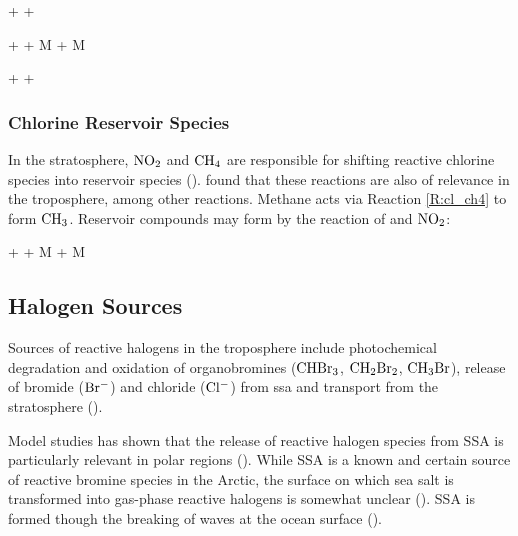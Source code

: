 \begin{reaction}
     +  \rightarrow {} + 
    \label{R:14}
\end{reaction}


\begin{reaction}
     +  + M \rightarrow {} + M
    \label{R:9}
\end{reaction}


\begin{reaction}
     +    + 
    \label{R:13}
\end{reaction}




\subsubsection{Chlorine Reservoir Species}

In the stratosphere, $\mathrm{NO_2}$ and $\mathrm{CH_4}$ are responsible for shifting reactive chlorine species into reservoir species (\cite{SeinfeldSpyros}). \cite{Wang_2019} found that these reactions are also of relevance in the troposphere, among other reactions. Methane acts via Reaction \ref{R:cl_ch4} to form $\mathrm{CH_3}$. Reservoir compounds may form by the reaction of  and $\mathrm{NO_2}$: 

\begin{reaction}
     +  + M \rightarrow {} + M
    \label{R:clono2}
\end{reaction}

\subsection{Halogen Sources}\label{sec:halogen_sources}

Sources of reactive halogens in the troposphere include photochemical degradation and oxidation of organobromines ($\mathrm{CHBr_3}$, $\mathrm{CH_2Br_2}$, $\mathrm{CH_3Br}$), release of bromide ($\mathrm{Br^-}$) and chloride ($\mathrm{Cl^-}$) from \acrfull{ssa} and transport from the stratosphere (\cite{Schmidt}). 

\medskip

Model studies has shown that the release of reactive halogen species from SSA is particularly relevant in polar regions (\cite{Schmidt}). While SSA is a known and certain source of reactive bromine species in the Arctic, the surface on which sea salt is transformed into gas-phase reactive halogens is somewhat unclear (\cite{Simpson2005}). SSA is formed though the breaking of waves at the ocean surface (\cite{Simpson2015}). 

